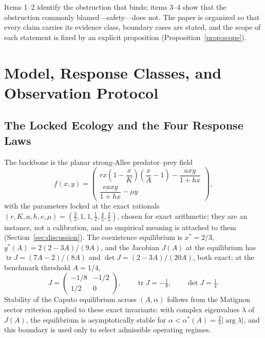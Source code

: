 \documentclass[mathematics,article,accept,pdftex,moreauthors]{Definitions/mdpi}
\begin{document}
Items 1--2 identify the obstruction that binds; items 3--4 show that the obstruction commonly blamed---safety---does not. The paper is organized so that every claim carries its evidence class, boundary cases are stated, and the scope of each statement is fixed by an explicit proposition (Proposition~\ref{prop:scope}).

\section{Model, Response Classes, and Observation Protocol}
\label{sec:model}

\subsection{The Locked Ecology and the Four Response Laws}

The backbone is the planar strong-Allee predator--prey field
\begin{equation}
f(x,y)=\begin{pmatrix} r x\left(1-\dfrac{x}{K}\right)\left(\dfrac{x}{A}-1\right)-\dfrac{a x y}{1+h x}\\[2mm]
\dfrac{e a x y}{1+h x}-\mu y\end{pmatrix},
\label{eq:field}
\end{equation}
with the parameters locked at the exact rationals $(r,K,a,h,e,\mu)=(\tfrac32,1,1,\tfrac12,\tfrac45,\tfrac25)$, chosen for exact arithmetic; they are an instance, not a calibration, and no empirical meaning is attached to them (Section~\ref{sec:discussion}). The coexistence equilibrium is $x^{*}=2/3$, $y^{*}(A)=2(2-3A)/(9A)$, and the Jacobian $J(A)$ at the equilibrium has $\operatorname{tr}J=(7A-2)/(8A)$ and $\det J=(2-3A)/(20A)$, both exact; at the benchmark threshold $A=1/4$,
\begin{equation}
J=\begin{pmatrix}-1/8 & -1/2\\ 1/2 & 0\end{pmatrix},\qquad \operatorname{tr}J=-\tfrac18,\qquad \det J=\tfrac14 .
\label{eq:J}
\end{equation}
Stability of the Caputo equilibrium across $(A,\alpha)$ follows from the Matignon sector criterion \cite{Matignon1996} applied to these exact invariants: with complex eigenvalues $\lambda$ of $J(A)$, the equilibrium is asymptotically stable for $\alpha<\alpha^{*}(A)=\tfrac{2}{\pi}|\arg\lambda|$, and this boundary is used only to select admissible operating regimes.
\end{document}

